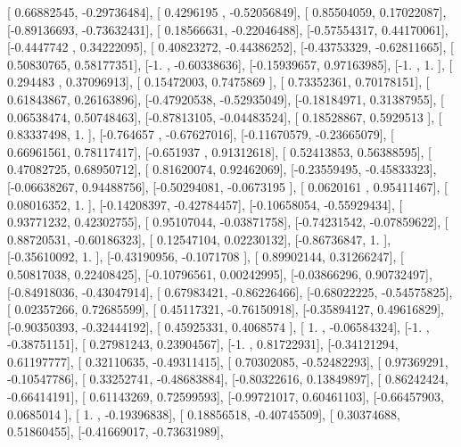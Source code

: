 \documentclass{article}
\begin{document}
       [ 0.66882545, -0.29736484],
       [ 0.4296195 , -0.52056849],
       [ 0.85504059,  0.17022087],
       [-0.89136693, -0.73632431],
       [ 0.18566631, -0.22046488],
       [-0.57554317,  0.44170061],
       [-0.4447742 ,  0.34222095],
       [ 0.40823272, -0.44386252],
       [-0.43753329, -0.62811665],
       [ 0.50830765,  0.58177351],
       [-1.        , -0.60338636],
       [-0.15939657,  0.97163985],
       [-1.        ,  1.        ],
       [ 0.294483  ,  0.37096913],
       [ 0.15472003,  0.7475869 ],
       [ 0.73352361,  0.70178151],
       [ 0.61843867,  0.26163896],
       [-0.47920538, -0.52935049],
       [-0.18184971,  0.31387955],
       [ 0.06538474,  0.50748463],
       [-0.87813105, -0.04483524],
       [ 0.18528867,  0.5929513 ],
       [ 0.83337498,  1.        ],
       [-0.764657  , -0.67627016],
       [-0.11670579, -0.23665079],
       [ 0.66961561,  0.78117417],
       [-0.651937  ,  0.91312618],
       [ 0.52413853,  0.56388595],
       [ 0.47082725,  0.68950712],
       [ 0.81620074,  0.92462069],
       [-0.23559495, -0.45833323],
       [-0.06638267,  0.94488756],
       [-0.50294081, -0.0673195 ],
       [ 0.0620161 ,  0.95411467],
       [ 0.08016352,  1.        ],
       [-0.14208397, -0.42784457],
       [-0.10658054, -0.55929434],
       [ 0.93771232,  0.42302755],
       [ 0.95107044, -0.03871758],
       [-0.74231542, -0.07859622],
       [ 0.88720531, -0.60186323],
       [ 0.12547104,  0.02230132],
       [-0.86736847,  1.        ],
       [-0.35610092,  1.        ],
       [-0.43190956, -0.1071708 ],
       [ 0.89902144,  0.31266247],
       [ 0.50817038,  0.22408425],
       [-0.10796561,  0.00242995],
       [-0.03866296,  0.90732497],
       [-0.84918036, -0.43047914],
       [ 0.67983421, -0.86226466],
       [-0.68022225, -0.54575825],
       [ 0.02357266,  0.72685599],
       [ 0.45117321, -0.76150918],
       [-0.35894127,  0.49616829],
       [-0.90350393, -0.32444192],
       [ 0.45925331,  0.4068574 ],
       [ 1.        , -0.06584324],
       [-1.        , -0.38751151],
       [ 0.27981243,  0.23904567],
       [-1.        ,  0.81722931],
       [-0.34121294,  0.61197777],
       [ 0.32110635, -0.49311415],
       [ 0.70302085, -0.52482293],
       [ 0.97369291, -0.10547786],
       [ 0.33252741, -0.48683884],
       [-0.80322616,  0.13849897],
       [ 0.86242424, -0.66414191],
       [ 0.61143269,  0.72599593],
       [-0.99721017,  0.60461103],
       [-0.66457903,  0.0685014 ],
       [ 1.        , -0.19396838],
       [ 0.18856518, -0.40745509],
       [ 0.30374688,  0.51860455],
       [-0.41669017, -0.73631989],
\end{document}
